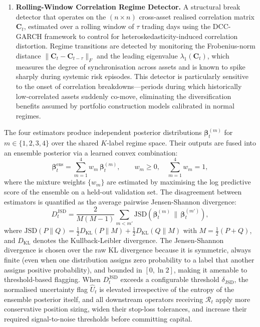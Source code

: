 \documentclass[12pt,openany]{book}
\numberwithin{equation}{chapter}
\theoremstyle{plain}
\theoremstyle{definition}
\theoremstyle{remark}
\begin{document}
\begin{enumerate}
    \item \textbf{Rolling-Window Correlation Regime Detector.} A structural break detector that operates on the $(n \times n)$ cross-asset realised correlation matrix $\mathbf{C}_t$, estimated over a rolling window of $\tau$ trading days using the DCC-GARCH framework to control for heteroskedasticity-induced correlation distortion. Regime transitions are detected by monitoring the Frobenius-norm distance $\|\mathbf{C}_t - \mathbf{C}_{t-\tau}\|_F$ and the leading eigenvalue $\lambda_1(\mathbf{C}_t)$, which measures the degree of synchronisation across assets and is known to spike sharply during systemic risk episodes. This detector is particularly sensitive to the onset of correlation breakdowns---periods during which historically low-correlated assets suddenly co-move, eliminating the diversification benefits assumed by portfolio construction models calibrated in normal regimes.
\end{enumerate}

The four estimators produce independent posterior distributions $\boldsymbol{\beta}_t^{(m)}$ for $m \in \{1, 2, 3, 4\}$ over the shared $K$-label regime space. Their outputs are fused into an ensemble posterior via a learned convex combination:
\begin{equation}
    \boldsymbol{\beta}_t^{\mathrm{ens}} = \sum_{m=1}^{4} w_m\, \boldsymbol{\beta}_t^{(m)}, \qquad w_m \geq 0,\quad \sum_{m=1}^{4} w_m = 1,
\end{equation}
where the mixture weights $\{w_m\}$ are estimated by maximising the log predictive score of the ensemble on a held-out validation set. The disagreement between estimators is quantified as the average pairwise Jensen-Shannon divergence:
\begin{equation}
    D_t^{\mathrm{JSD}} = \frac{2}{M(M-1)} \sum_{m < m'} \mathrm{JSD}\!\left(\boldsymbol{\beta}_t^{(m)} \,\|\, \boldsymbol{\beta}_t^{(m')}\right),
\end{equation}
where $\mathrm{JSD}(P \| Q) = \frac{1}{2} D_{\mathrm{KL}}(P \| M) + \frac{1}{2} D_{\mathrm{KL}}(Q \| M)$ with $M = \frac{1}{2}(P + Q)$, and $D_{\mathrm{KL}}$ denotes the Kullback-Leibler divergence. The Jensen-Shannon divergence is chosen over the raw KL divergence because it is symmetric, always finite (even when one distribution assigns zero probability to a label that another assigns positive probability), and bounded in $[0, \ln 2]$, making it amenable to threshold-based flagging. When $D_t^{\mathrm{JSD}}$ exceeds a configurable threshold $\delta_{\mathrm{JSD}}$, the normalised uncertainty flag $\hat{U}_t$ is elevated irrespective of the entropy of the ensemble posterior itself, and all downstream operators receiving $\mathcal{R}_t$ apply more conservative position sizing, widen their stop-loss tolerances, and increase their required signal-to-noise thresholds before committing capital.
\end{document}
